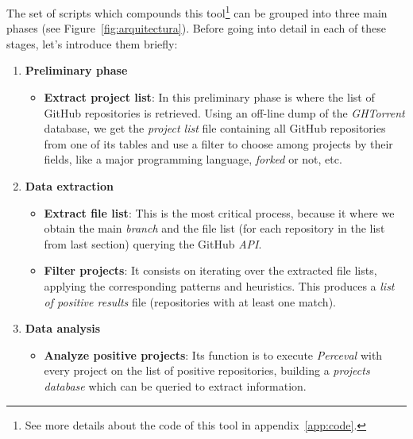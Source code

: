 \documentclass[a4paper, 12pt]{book}
\begin{document}
The set of scripts which compounds this tool\footnote{See more details about the code of this tool in appendix~\ref{app:code}.}
can be grouped into three main phases (see Figure~\ref{fig:arquitectura}).
Before going into detail in each of these stages, let's introduce them briefly:

\begin{enumerate}
  \item \textbf{Preliminary phase}
    \begin{itemize}
      \item \textbf{Extract project list}:
            In this preliminary phase is where the list of GitHub repositories is retrieved. Using an off-line dump of
            the \emph{GHTorrent} database, we get the \emph{project list} file containing all GitHub repositories from one of its tables
            and use a filter to choose among projects by their fields, like a major programming language, \textit{forked} or not, etc.
    \end{itemize}
  \item \textbf{Data extraction}
    \begin{itemize}
      \item \textbf{Extract file list}:
            This is the most critical process, because it where we obtain the main \textit{branch} and the file list
            (for each repository in the list from last section) querying the GitHub \textit{API}.
      \item \textbf{Filter projects}:
            It consists on iterating over the extracted file lists, applying the corresponding patterns and heuristics.
            This produces a \emph{list of positive results} file (repositories with at least one match).
    \end{itemize}
  \item \textbf{Data analysis}
    \begin{itemize}
      \item \textbf{Analyze positive projects}:
            Its function is to execute \emph{Perceval} with every project on the list of positive repositories,
            building a \emph{projects database} which can be queried to extract information.
    \end{itemize}
\end{enumerate}
\end{document}

